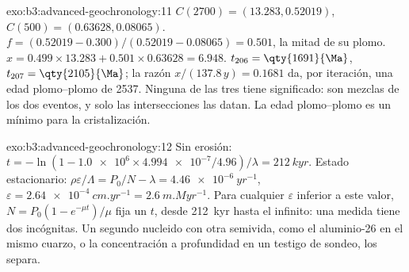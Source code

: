 \begin{solution}{exo:b3:advanced-geochronology:11}
$C(2700) = (13.283, 0.52019)$, $C(500) = (0.63628, 0.08065)$. $f = (0.52019 -
0.300)/(0.52019 - 0.08065) = 0.501$, la mitad de su plomo. $x = 0.499\times13.283 +
0.501\times0.63628 = 6.948$. $t_{206} = \qty{1691}{\Ma}$, $t_{207} =
\qty{2105}{\Ma}$; la razón $x/(137.8\,y) = 0.1681$ da, por iteración, una
edad plomo--plomo de \qty{2537}{\Ma}. Ninguna de las tres tiene significado: son
mezclas de los dos eventos, y solo las intersecciones las datan. La edad plomo--plomo
es un mínimo para la cristalización.
\end{solution}

\begin{solution}{exo:b3:advanced-geochronology:12}
Sin erosión: $t = -\ln(1 - \num{1.0e6}\times\num{4.994e-7}/4.96)/\lambda =
\qty{212}{kyr}$. Estado estacionario: $\rho\varepsilon/\Lambda = P_0/N - \lambda =
\qty{4.46e-6}{yr^{-1}}$, $\varepsilon = \qty{2.64e-4}{cm.yr^{-1}} =
\qty{2.6}{m.Myr^{-1}}$. Para cualquier $\varepsilon$ inferior a este valor, $N =
P_0(1 - e^{-\mu t})/\mu$ fija un $t$, desde \qty{212}{kyr} hasta
el infinito: una medida tiene dos incógnitas. Un segundo nucleido con otra
semivida, como el aluminio-26 en el mismo cuarzo, o la concentración a
profundidad en un testigo de sondeo, los separa.
\end{solution}

